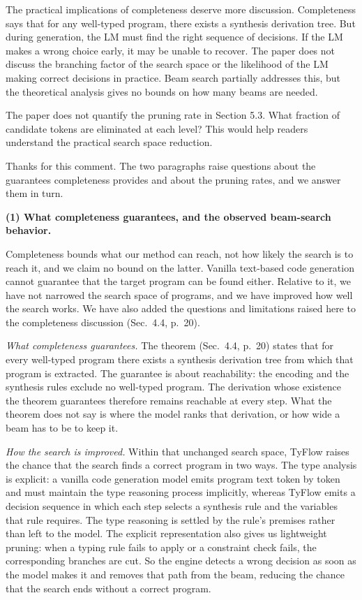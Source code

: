 \documentclass[11pt,a4paper]{article}
\newenvironment{revcomment}[1]{%
  \par\vspace{1.9em}\needspace{5\baselineskip}\noindent{\color{black!30}\hrule height 0.4pt}%
  \smallskip\par\noindent{\bfseries\color{accent}#1}\par\nopagebreak
  \vspace{2pt}%
  \begin{tcolorbox}[enhanced, breakable, frame hidden,
    colback=black!3, borderline west={1.6pt}{0pt}{accent!70},
    left=9pt, right=6pt, top=5pt, bottom=5pt,
    fontupper=\small\itshape, before skip=0pt, after skip=0pt,
    breakable, pad at break*=3pt]\setlength{\parskip}{0.3em}%
}{\end{tcolorbox}}
\newcommand{\response}{\par\medskip\needspace{3\baselineskip}\noindent{\bfseries\color{accent}Response.}%
  \par\nopagebreak\smallskip\ignorespaces}
\begin{document}
\label{com:1.2}
\begin{revcomment}{Comment 1.2.}
The practical implications of completeness deserve more discussion.
Completeness says that for any well-typed program, there exists a synthesis
derivation tree. But during generation, the LM must find the right sequence
of decisions. If the LM makes a wrong choice early, it may be unable to
recover. The paper does not discuss the branching factor of the search space
or the likelihood of the LM making correct decisions in practice. Beam
search partially addresses this, but the theoretical analysis gives no
bounds on how many beams are needed.\par\smallskip
The paper does not quantify the pruning rate in Section 5.3. What fraction
of candidate tokens are eliminated at each level? This would help readers
understand the practical search space reduction.
\end{revcomment}

\response Thanks for this comment. The two paragraphs raise questions about the guarantees completeness provides and about the pruning rates, and we answer them in turn.

\textbf{(1) What completeness guarantees, and the observed beam-search behavior.}

Completeness bounds what our method can reach, not how likely the search is to reach it, and we claim no bound on the latter. Vanilla text-based code generation cannot guarantee that the target program can be found either. Relative to it, we have not narrowed the search space of programs, and we have improved how well the search works. We have also added the questions and limitations raised here to the completeness discussion (Sec.~4.4, p.~20).

\emph{What completeness guarantees.} The theorem (Sec.~4.4, p.~20) states that for every well-typed program there exists a synthesis derivation tree from which that program is extracted. The guarantee is about reachability: the encoding and the synthesis rules exclude no well-typed program. The derivation whose existence the theorem guarantees therefore remains reachable at every step. What the theorem does not say is where the model ranks that derivation, or how wide a beam has to be to keep it.

\emph{How the search is improved.} Within that unchanged search space, TyFlow raises the chance that the search finds a correct program in two ways. 
The type analysis is explicit: a vanilla code generation model emits program text token by token and must maintain the type reasoning process implicitly, whereas TyFlow emits a decision sequence in which each step selects a synthesis rule and the variables that rule requires. The type reasoning is settled by the rule's premises rather than left to the model. 
The explicit representation also gives us lightweight pruning: when a typing rule fails to apply or a constraint check fails, the corresponding branches are cut. So the engine detects a wrong decision as soon as the model makes it and removes that path from the beam, reducing the chance that the search ends without a correct program.
\end{document}

